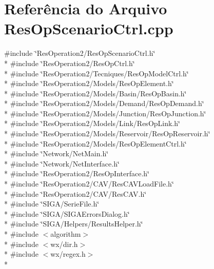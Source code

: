 \section{Referência do Arquivo Res\+Op\+Scenario\+Ctrl.\+cpp}
\label{_res_op_scenario_ctrl_8cpp}
{\ttfamily \#include \char`\"{}Res\+Operation2/\+Res\+Op\+Scenario\+Ctrl.\+h\char`\"{}}\\*
{\ttfamily \#include \char`\"{}Res\+Operation2/\+Res\+Op\+Ctrl.\+h\char`\"{}}\\*
{\ttfamily \#include \char`\"{}Res\+Operation2/\+Tecniques/\+Res\+Op\+Model\+Ctrl.\+h\char`\"{}}\\*
{\ttfamily \#include \char`\"{}Res\+Operation2/\+Models/\+Res\+Op\+Element.\+h\char`\"{}}\\*
{\ttfamily \#include \char`\"{}Res\+Operation2/\+Models/\+Basin/\+Res\+Op\+Basin.\+h\char`\"{}}\\*
{\ttfamily \#include \char`\"{}Res\+Operation2/\+Models/\+Demand/\+Res\+Op\+Demand.\+h\char`\"{}}\\*
{\ttfamily \#include \char`\"{}Res\+Operation2/\+Models/\+Junction/\+Res\+Op\+Junction.\+h\char`\"{}}\\*
{\ttfamily \#include \char`\"{}Res\+Operation2/\+Models/\+Link/\+Res\+Op\+Link.\+h\char`\"{}}\\*
{\ttfamily \#include \char`\"{}Res\+Operation2/\+Models/\+Reservoir/\+Res\+Op\+Reservoir.\+h\char`\"{}}\\*
{\ttfamily \#include \char`\"{}Res\+Operation2/\+Models/\+Res\+Op\+Element\+Ctrl.\+h\char`\"{}}\\*
{\ttfamily \#include \char`\"{}Network/\+Net\+Main.\+h\char`\"{}}\\*
{\ttfamily \#include \char`\"{}Network/\+Net\+Interface.\+h\char`\"{}}\\*
{\ttfamily \#include \char`\"{}Res\+Operation2/\+Res\+Op\+Interface.\+h\char`\"{}}\\*
{\ttfamily \#include \char`\"{}Res\+Operation2/\+C\+A\+V/\+Res\+C\+A\+V\+Load\+File.\+h\char`\"{}}\\*
{\ttfamily \#include \char`\"{}Res\+Operation2/\+C\+A\+V/\+Res\+C\+A\+V.\+h\char`\"{}}\\*
{\ttfamily \#include \char`\"{}S\+I\+G\+A/\+Serie\+File.\+h\char`\"{}}\\*
{\ttfamily \#include \char`\"{}S\+I\+G\+A/\+S\+I\+G\+A\+Errors\+Dialog.\+h\char`\"{}}\\*
{\ttfamily \#include \char`\"{}S\+I\+G\+A/\+Helpers/\+Results\+Helper.\+h\char`\"{}}\\*
{\ttfamily \#include $<$algorithm$>$}\\*
{\ttfamily \#include $<$wx/dir.\+h$>$}\\*
{\ttfamily \#include $<$wx/regex.\+h$>$}\\*
